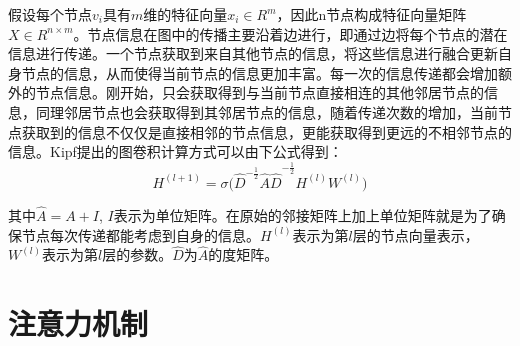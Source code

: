 假设每个节点$v_i$具有$m$维的特征向量$x_i\in R^m$，因此n节点构成特征向量矩阵$X\in R^{n\times m}$。节点信息在图中的传播主要沿着边进行，即通过边将每个节点的潜在信息进行传递。一个节点获取到来自其他节点的信息，将这些信息进行融合更新自身节点的信息，从而使得当前节点的信息更加丰富。每一次的信息传递都会增加额外的节点信息。刚开始，只会获取得到与当前节点直接相连的其他邻居节点的信息，同理邻居节点也会获取得到其邻居节点的信息，随着传递次数的增加，当前节点获取到的信息不仅仅是直接相邻的节点信息，更能获取得到更远的不相邻节点的信息。Kipf提出的图卷积计算方式可以由下公式得到：
\begin{equation}\label{GNNFormula1}
	H^{\left(l+1\right)}=\sigma{{(\hat{D}}^{-\frac{1}{2}}\hat{A}\hat{D}}^{-\frac{1}{2}}H^{\left(l\right)}W^{\left(l\right)})
\end{equation}

其中$\hat{A}=A+I$, $I$表示为单位矩阵。在原始的邻接矩阵上加上单位矩阵就是为了确保节点每次传递都能考虑到自身的信息。$H^{\left(l\right)}$表示为第$l$层的节点向量表示，$W^{\left(l\right)}$表示为第$l$层的参数。$\hat{D}$为$\hat{A}$的度矩阵。

\section{注意力机制}


